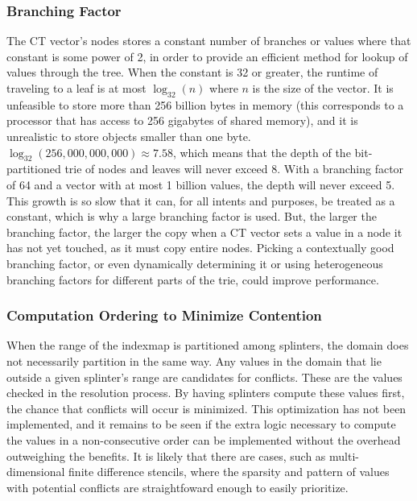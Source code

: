 \documentclass[pageno]{jpaper}
\begin{document}
\subsubsection{Branching Factor}
The CT vector's nodes stores a constant number of branches or values where that
constant is some power of 2, in order to provide an efficient method for lookup
of values through the tree. When the constant is 32 or greater, the runtime of
traveling to a leaf is at most $\log_{32}(n)$ where $n$ is the size of the
vector. It is unfeasible to store more than 256 billion bytes in memory (this
corresponds to a processor that has access to 256 gigabytes of shared memory),
and it is unrealistic to store objects smaller than one byte.
$\log_{32}(256,000,000,000) \approx 7.58$, which means that the depth of the
bit-partitioned trie of nodes and leaves will never exceed 8. With a branching
factor of 64 and a vector with at most 1 billion values, the depth will never
exceed 5. This growth is so slow that it can, for all intents and purposes, be
treated as a constant, which is why a large branching factor is used. But, the
larger the branching factor, the larger the copy when a CT vector sets a value
in a node it has not yet touched, as it must copy entire nodes. Picking a
contextually good branching factor, or even dynamically determining it or using
heterogeneous branching factors for different parts of the trie, could improve
performance.

\subsubsection{Computation Ordering to Minimize Contention}
When the range of the indexmap is partitioned among splinters, the domain does
not necessarily partition in the same way. Any values in the domain that lie
outside a given splinter's range are candidates for conflicts. These are the
values checked in the resolution process. By having splinters compute these
values first, the chance that conflicts will occur is minimized.
This optimization has not been implemented, and it remains to be seen if the
extra logic necessary to compute the values in a non-consecutive order can be
implemented without the overhead outweighing the benefits.
It is likely that there are cases, such as multi-dimensional finite difference
stencils, where the sparsity and pattern of values with potential conflicts are
straightfoward enough to easily prioritize.
\end{document}
